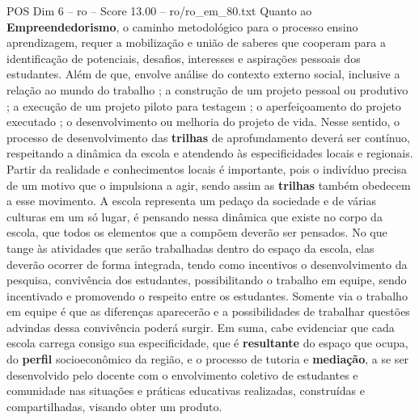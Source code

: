 \begin{textsample}{POS Dim 6 – ro – Score 13.00 – ro/ro\_em\_80.txt}
Quanto ao \textbf{Empreendedorismo}, o caminho metodológico para o processo ensino aprendizagem, requer a mobilização e união de saberes que cooperam para a identificação de potenciais, desafios, interesses e aspirações pessoais dos estudantes.
Além de que, envolve análise do contexto externo social, inclusive a relação ao mundo do trabalho ; a construção de um projeto pessoal ou produtivo ; a execução de um projeto piloto para testagem ; o aperfeiçoamento do projeto executado ; o desenvolvimento ou melhoria do projeto de vida.
Nesse sentido, o processo de desenvolvimento das \textbf{trilhas} de aprofundamento deverá ser contínuo, respeitando a dinâmica da escola e atendendo às especificidades locais e regionais.
Partir da realidade e conhecimentos locais é importante, pois o indivíduo precisa de um motivo que o impulsiona a agir, sendo assim as \textbf{trilhas} também obedecem a esse movimento.
A escola representa um pedaço da sociedade e de várias culturas em um só lugar, é pensando nessa dinâmica que existe no corpo da escola, que todos os elementos que a compõem deverão ser pensados.
No que tange às atividades que serão trabalhadas dentro do espaço da escola, elas deverão ocorrer de forma integrada, tendo como incentivos o desenvolvimento da pesquisa, convivência dos estudantes, possibilitando o trabalho em equipe, sendo incentivado e promovendo o respeito entre os estudantes.
Somente via o trabalho em equipe é que as diferenças aparecerão e a possibilidades de trabalhar questões advindas dessa convivência poderá surgir.
Em suma, cabe evidenciar que cada escola carrega consigo sua especificidade, que é \textbf{resultante} do espaço que ocupa, do \textbf{perfil} socioeconômico da região, e o processo de tutoria e \textbf{mediação}, a se ser desenvolvido pelo docente com o envolvimento coletivo de estudantes e comunidade nas situações e práticas educativas realizadas, construídas e compartilhadas, visando obter um produto.

\end{textsample}

